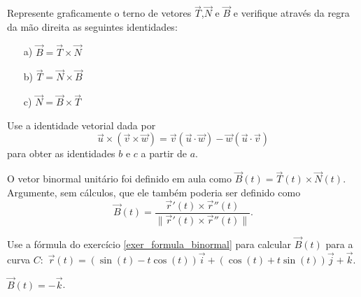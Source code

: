 \begin{exer} Represente graficamente o terno de vetores $\vec{T}$,$\vec{N}$ e $\vec{B}$ e verifique através da regra da mão direita as seguintes identidades:
\begin{itemize}
\item[a)]$\vec{B}=\vec{T}\times\vec{N}$
\item[b)]$\vec{T}=\vec{N}\times\vec{B}$
\item[c)]$\vec{N}=\vec{B}\times\vec{T}$
\end{itemize}
Use a identidade vetorial dada por
$$\vec{u}\times\left(\vec{v}\times\vec{w}\right)=\vec{v}\left(\vec{u}\cdot\vec{w}\right)-\vec{w}\left(\vec{u}\cdot\vec{v}\right)$$ para obter as identidades $b$ e $c$ a partir de $a$.
\end{exer}
\begin{exer}\label{exer_formula_binormal}
 O vetor binormal unitário foi definido em aula como $\vec{B}(t)=\vec{T}(t)\times\vec{N}(t)$. Argumente, sem cálculos, que ele também poderia ser definido como 
 $$
 \vec{B}(t)=\frac{\vec{r}'(t)\times \vec{r}''(t)}{\|\vec{r}'(t)\times \vec{r}''(t)\|}.
 $$
\end{exer}
\begin{exer}
 Use a fórmula do exercício \ref{exer_formula_binormal} para calcular $\vec{B}(t)$ para a curva $C:$ $\vec{r}(t)=(\sin(t)-t\cos(t))\vec{i}+(\cos(t)+t\sin(t))\vec{j}+\vec{k}$.
\end{exer}
\begin{resp}
 $\vec{B}(t)=-\vec{k}$.
\end{resp}




